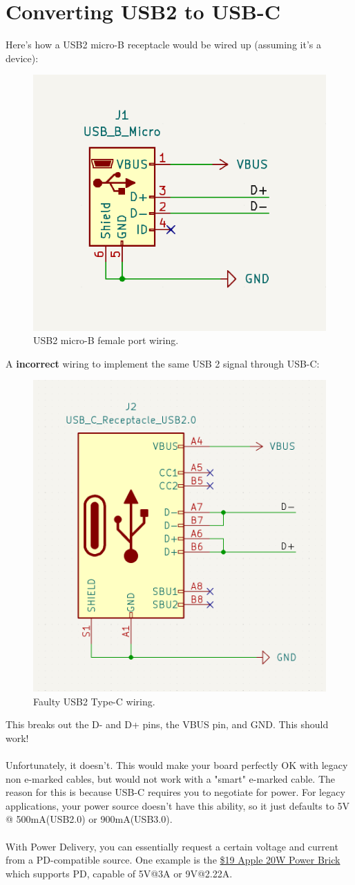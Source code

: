 \documentclass[12pt]{article}
\begin{document}
\section{Converting USB2 to USB-C}
Here's how a USB2 micro-B receptacle would be wired up (assuming it's a device):

\begin{figure}[h]
	\centering
	\includegraphics[width=0.43\linewidth]{images/USB-micro-B.png}
	\caption{USB2 micro-B female port wiring.}
	\label{fig:usb2_microB}
\end{figure}

A \textbf{incorrect} wiring to implement the same USB 2 signal through USB-C:

\begin{figure}[h]
	\centering
	\includegraphics[width=0.43\linewidth]{images/USB-faulty-type-C.png}
	\caption{Faulty USB2 Type-C wiring.}
	\label{fig:usb2_faulty_usbc}
\end{figure} 

\noindent 
This breaks out the D- and D+ pins, the VBUS pin, and GND. This should work!\\\\
\noindent
Unfortunately, it doesn't. This would make your board perfectly OK with legacy non e-marked cables, but would not work with a "smart" e-marked cable. The reason for this is because USB-C requires you to negotiate for power. For legacy applications, your power source doesn't have this ability, so it just defaults to 5V @ 500mA(USB2.0) or 900mA(USB3.0). \\\\
\noindent
With Power Delivery, you can essentially request a certain voltage and current from a PD-compatible source. One example is the \href{https://www.apple.com/shop/product/MHJA3AM/A/20w-usb-c-power-adapter}{\$19 Apple 20W Power Brick} which supports PD, capable of 5V@3A or 9V@2.22A. 
\end{document}
